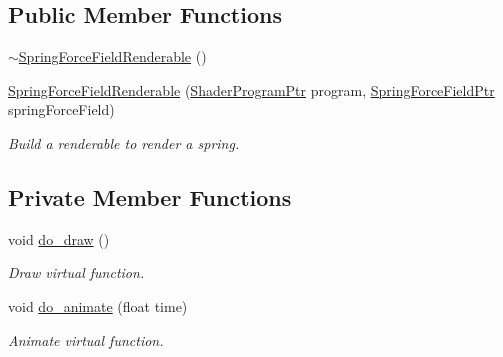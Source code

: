 \subsection*{Public Member Functions}
\begin{DoxyCompactItemize}
\item 
\hyperlink{classSpringForceFieldRenderable_a65de920b7c1490ae0368aaab3e41b7eb}{$\sim$\+Spring\+Force\+Field\+Renderable} ()
\item 
\hyperlink{classSpringForceFieldRenderable_a5dbba98c6a98ce30ee663bb1569b049c}{Spring\+Force\+Field\+Renderable} (\hyperlink{ShaderProgram_8hpp_af8e4af1ad4c53875ee5d32ab7e1f4966}{Shader\+Program\+Ptr} program, \hyperlink{SpringForceField_8hpp_a3f4fbe1af2c46f8804b45f804dacc708}{Spring\+Force\+Field\+Ptr} spring\+Force\+Field)
\begin{DoxyCompactList}\small\item\em Build a renderable to render a spring. \end{DoxyCompactList}\end{DoxyCompactItemize}
\subsection*{Private Member Functions}
\begin{DoxyCompactItemize}
\item 
void \hyperlink{classSpringForceFieldRenderable_ad74386934bac1b650a973abeed2a9a33}{do\+\_\+draw} ()
\begin{DoxyCompactList}\small\item\em Draw virtual function. \end{DoxyCompactList}\item 
void \hyperlink{classSpringForceFieldRenderable_a7ddf9b99051f6a3bd0c4d1f215f4c2b6}{do\+\_\+animate} (float time)
\begin{DoxyCompactList}\small\item\em Animate virtual function. \end{DoxyCompactList}\end{DoxyCompactItemize}

